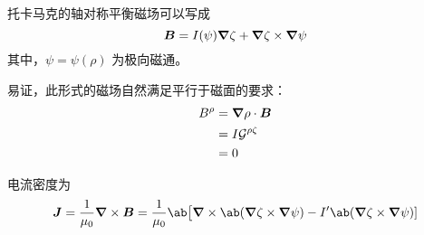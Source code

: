 托卡马克的轴对称平衡磁场可以写成
\begin{equation}
\bm{B} = I(\psi) \bm{\nabla}{\zeta}
+ \bm{\nabla}{\zeta} \times \bm{\nabla}{\psi}
\end{equation}
其中，$\psi = \psi(\rho)$ 为极向磁通。

易证，此形式的磁场自然满足平行于磁面的要求：
\begin{equation}\begin{aligned}
B^\rho &= \bm{\nabla}{\rho} \cdot \bm{B} \\
&= I \mathcal{G}^{\rho\zeta} \\
&= 0
\end{aligned}\end{equation}

电流密度为
\begin{equation}
\vec{J} = \frac{1}{\mu_0} \curl{\vec{B}} =
\frac{1}{\mu_0} \ab\big[
    \curl{\ab(\grad{\zeta} \times \grad{\psi})}
    - I' \ab(\grad{\zeta} \times \grad{\psi})
]
\end{equation}

